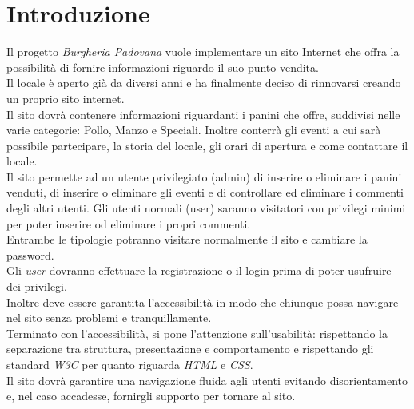 \section{Introduzione}
Il progetto \emph{Burgheria Padovana} vuole implementare un sito Internet che offra la possibilità di fornire informazioni riguardo il suo punto vendita.\\
Il locale è aperto già da diversi anni e ha finalmente deciso di rinnovarsi creando un proprio sito internet.\\
Il sito dovrà contenere informazioni riguardanti i panini che offre, suddivisi nelle varie categorie: Pollo, Manzo e Speciali. 
Inoltre conterrà gli eventi a cui sarà possibile partecipare, la storia del locale, gli orari di apertura e come contattare il locale.\\
Il sito permette ad un utente privilegiato (admin) di inserire o eliminare i panini venduti, di inserire o eliminare gli eventi e di controllare ed eliminare i commenti degli altri utenti. Gli utenti normali (user) saranno visitatori 
con privilegi minimi per poter inserire od eliminare i propri commenti.\\
Entrambe le tipologie potranno visitare normalmente il sito e cambiare la password.\\
Gli \emph{user} dovranno effettuare la registrazione o il login prima di poter usufruire dei privilegi.\\
Inoltre deve essere garantita l'accessibilità in modo che chiunque possa navigare nel sito senza problemi e tranquillamente.\\
Terminato con l'accessibilità, si pone l'attenzione sull'usabilità: rispettando la separazione tra struttura, presentazione e comportamento e rispettando gli standard \emph{W3C} per quanto riguarda \emph{HTML} e \emph{CSS}.\\
Il sito dovrà garantire una navigazione fluida agli utenti evitando disorientamento e, nel caso accadesse, fornirgli supporto per tornare al sito.\\